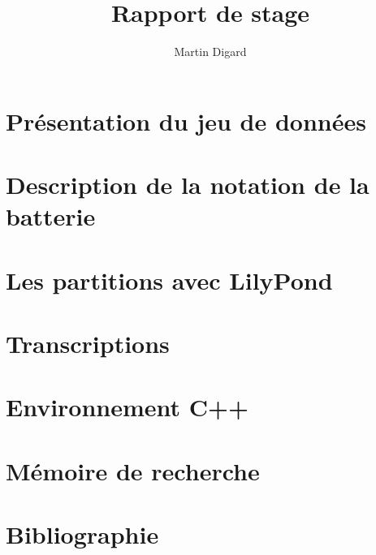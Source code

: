 \documentclass{report}
\begin{document}
	\title{Rapport de stage}
	\author{Martin Digard}
	\date{}
	\maketitle
	\tableofcontents
	\chapter{Présentation du jeu de données}
	
	\chapter{Description de la notation de la batterie}
	
	\chapter{Les partitions avec LilyPond}
	
	\chapter{Transcriptions}
	
	\chapter{Environnement C++}
	
	\chapter{Mémoire de recherche}
	
	\chapter{Bibliographie}
	
\end{document}
